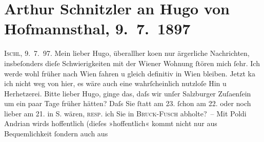 

               \section[Arthur Schnitzler an Hugo von Hofmannsthal, 9. 7. 1897]{ Arthur Schnitzler an Hugo von Hofmannsthal,
                    9. 7. 1897}\nopagebreak{}\rehead{ }\begin{ledgroupsized}[t]{13cm}\normalsize\beginnumbering{} \toendnotes[C]{\smallbreak\pagebreak[2]} 
\pstart
           \raggedleft{}{\pb}\textsc{Ischl}, 9. 7. 97.\pend
           \pstart
           Mein lieber Hugo, überallher ko{\geminationm}en
                    nur ärgerliche Nachrichten, insbeſonders dieſe Schwierigkeiten mit der Wiener Wohnung ſtören mich ſehr. Ich werde
                    wohl früher nach Wien fahren u gleich
                    definitiv in Wien bleiben.\pend
           \pstart
           Jetzt ka{\geminationn} ich nicht weg von hier, es wäre auch eine
                    wahrſcheinlich nutzloſe Hin u Herhetzerei. {\pb}Bitte
                    lieber Hugo, ginge das, daſs wir unſer Salzburger Zuſa{\geminationm}enſein um ein paar Tage
                    früher hätten? Daſs Sie ſtatt am 23.{ }ſchon am 22. oder
                    noch lieber am 21. in S. wären,
                        \textsc{resp.} ich Sie in \textsc{Bruck}-\textsc{Fusch} abholte? –\pend
           \pstart
           Mit Poldi Andrian wirds hoffentlich
                    (dieſes »hoffentlich« kommt nicht nur aus Bequemlichkeit ſondern auch aus

\end{ledgroupsized}
